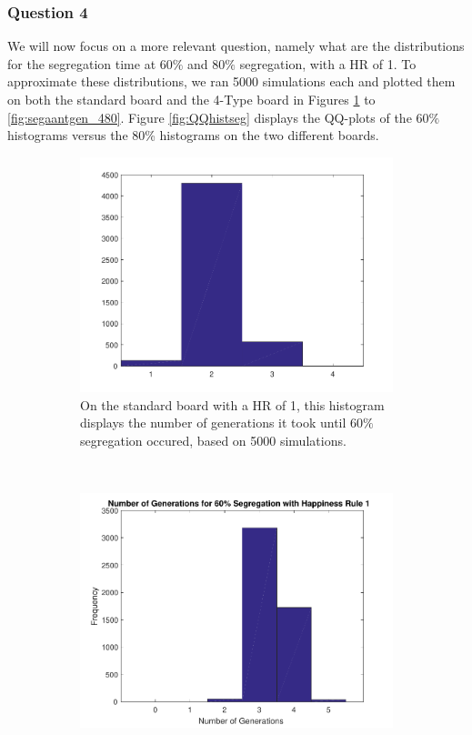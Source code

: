 \subsubsection{Question 4}

We will now focus on a more relevant question, namely what are the distributions for the segregation time at $60\%$ and $80\%$ segregation, with a  HR of  1. To approximate these distributions, we ran 5000 simulations each and plotted them on both the standard board and the 4-Type board in Figures \ref{fig:segaantgen_s60} to \ref{fig:segaantgen_480}. Figure \ref{fig:QQhistseg} displays the QQ-plots of the \(60\%\) histograms versus the 80\% histograms on the two different boards.
\begin{figure}[H]
\centering
\begin{subfigure}{0.35\textwidth}
    \includegraphics[width=\textwidth]{./60_80_segregation_aantgen/60_segregation.pdf}
    \caption{On the standard board with a HR of 1, this histogram  displays the number of generations it took until $60\%$ segregation occured, based on 5000 simulations.}
    \label{fig:segaantgen_s60}
\end{subfigure}
~
\begin{subfigure}{0.35\textwidth}
    \includegraphics[width=\textwidth]{./60_80_segregation_aantgen/4TypeBoard/60_segregation.pdf}

\end{subfigure}
\end{figure}
